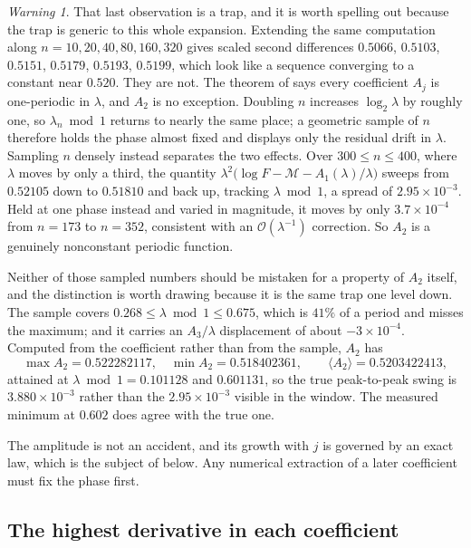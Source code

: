 \documentclass[11pt,oneside]{article}
\theoremstyle{definition}
\theoremstyle{remark}
\newtheorem{warning}[theorem]{Warning}
\newcommand{\bigO}{\mathcal O}
\begin{document}
\begin{warning}
That last observation is a trap, and it is worth spelling out because the trap is generic to
this whole expansion.  Extending the same computation along $n=10,20,40,80,160,320$ gives
scaled second differences $0.5066$, $0.5103$, $0.5151$, $0.5179$, $0.5193$, $0.5199$, which
look like a sequence converging to a constant near $0.520$.  They are not.  The theorem of
 says every coefficient $A_j$ is one-periodic in $\lambda$, and
$A_2$ is no exception.  Doubling $n$ increases $\log_2\lambda$ by roughly one, so
$\lambda_n\bmod 1$ returns to nearly the same place; a geometric sample of $n$ therefore
holds the phase almost fixed and displays only the residual drift in $\lambda$.  Sampling
$n$ densely instead separates the two effects.  Over $300\le n\le400$, where $\lambda$ moves
by only a third, the quantity
$\lambda^2\bigl(\log F-\mathcal M-A_1(\lambda)/\lambda\bigr)$ sweeps from $0.52105$ down to
$0.51810$ and back up, tracking $\lambda\bmod1$, a spread of $2.95\times10^{-3}$.  Held at
one phase instead and varied in magnitude, it moves by only $3.7\times10^{-4}$ from
$n=173$ to $n=352$, consistent with an $\bigO(\lambda^{-1})$ correction.  So $A_2$ is a
genuinely nonconstant periodic function.

Neither of those sampled numbers should be mistaken for a property of $A_2$ itself, and the
distinction is worth drawing because it is the same trap one level down.  The sample covers
$0.268\le\lambda\bmod1\le0.675$, which is $41\%$ of a period and misses the maximum; and it
carries an $A_3/\lambda$ displacement of about $-3\times10^{-4}$.  Computed from the
coefficient rather than from the sample, $A_2$ has
\begin{equation}
 \max A_2=0.522282117,\quad \min A_2=0.518402361,
 \qquad \langle A_2\rangle=0.5203422413,                   \label{eq:as-A2-stats}
\end{equation}
attained at $\lambda\bmod1=0.101128$ and $0.601131$, so the true peak-to-peak swing is
$3.880\times10^{-3}$ rather than the $2.95\times10^{-3}$ visible in the window.  The measured
minimum at $0.602$ does agree with the true one.

The amplitude is not an accident, and its growth with $j$ is governed by an exact law, which
is the subject of  below.  Any numerical extraction of a
later coefficient must fix the phase first.
\end{warning}

\subsection{The highest derivative in each coefficient}
\label{subsec:as-leading-derivative}
\end{document}
